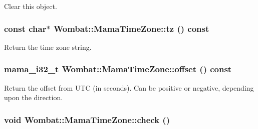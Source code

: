 Clear this object. \hypertarget{classWombat_1_1MamaTimeZone_ad1beb3c4835e44f14044f48a1cb40d29}{
\subsubsection[{tz}]{\setlength{\rightskip}{0pt plus 5cm}const char$\ast$ Wombat::MamaTimeZone::tz () const}}
\label{classWombat_1_1MamaTimeZone_ad1beb3c4835e44f14044f48a1cb40d29}


Return the time zone string. \hypertarget{classWombat_1_1MamaTimeZone_a067532a001858bb60fbbc4fabe319ad8}{
\subsubsection[{offset}]{\setlength{\rightskip}{0pt plus 5cm}mama\_\-i32\_\-t Wombat::MamaTimeZone::offset () const}}
\label{classWombat_1_1MamaTimeZone_a067532a001858bb60fbbc4fabe319ad8}


Return the offset from UTC (in seconds). Can be positive or negative, depending upon the direction. \hypertarget{classWombat_1_1MamaTimeZone_a1fa15041d8226236ab7350ec0be7c5c2}{
\subsubsection[{check}]{\setlength{\rightskip}{0pt plus 5cm}void Wombat::MamaTimeZone::check ()}}
\label{classWombat_1_1MamaTimeZone_a1fa15041d8226236ab7350ec0be7c5c2}


